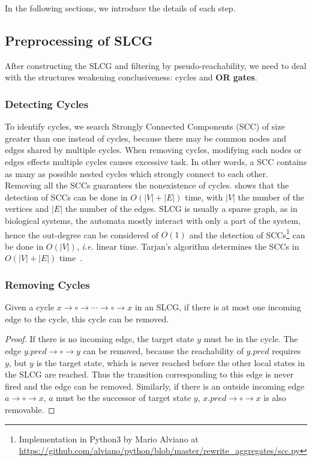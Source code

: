 \documentclass[runningheads]{llncs}
\newcommand{\roux}[2]{{\sout{#1}}{{\color{purple}~#2}}}
\begin{document}
In the following sections, we introduce the details of each step.

\subsection{Preprocessing of SLCG}\label{sectprecond}
After constructing the SLCG and filtering by pseudo-reachability, we need to deal with the structures weakening conclusiveness: cycles and \textbf{OR gates}.
\subsubsection{Detecting Cycles}
To identify cycles, we search Strongly Connected Components (SCC) of size greater than one instead of cycles, because there may be common nodes and edges shared by multiple cycles.
When removing cycles,  modifying such nodes or edges effects multiple cycles causes excessive task.
In other words, a SCC contains as many as possible nested cycles which strongly connect to each other.
Removing all the SCCs guarantees the nonexistence of cycles.
\cite{tarjan1972} shows that the detection of SCCs can be done in $O (|V|+|E|)$ time, with $|V|$ the number of the vertices and $|E|$ the number of the edges.
SLCG is usually a sparse graph, as in biological systems, the automata mostly interact with only a part of the system, hence the out-degree can be considered of $O (1)$ and the detection of SCCs\footnote{Implementation in Python3 by Mario Alviano at \url{https://github.com/alviano/python/blob/master/rewrite_aggregates/scc.py}} can be done in $O(|V|)$, \textit{i.e.} linear time.
Tarjan's algorithm determines the SCCs in $O(|V|+|E|)$ time~\cite{tarjan1972}. 

\subsubsection{Removing Cycles}
\begin{theorem}\label{th:break_cycle}
Given a cycle $x\to \circ \to \cdots \to \circ \to x$ in an SLCG, if there is at most one incoming edge to the cycle, this cycle can be removed.
\end{theorem}
\begin{proof}
If there is no incoming edge, the target state $y$ must be in the cycle. 
The edge $y.pred\to\circ\to y$ can be removed, because the reachability of $y.pred$ requires $y$, but $y$ is the target state, which is never reached before the other local states in the SLCG are reached.
Thus the transition corresponding to this edge is never fired and the edge can be removed.
Similarly, if there is an outside incoming edge $a\to \circ \to x$, $a$ must be the successor of target state $y$, $x.pred\to\circ\to x$ is also removable.
\end{proof}
\end{document}
